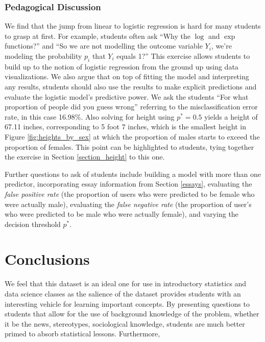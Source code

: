 \documentclass{article}\usepackage[]{graphicx}\usepackage[]{color}
\begin{document}
\subsubsection{Pedagogical Discussion}
We find that the jump from linear to logistic regression is hard for many students to grasp at first.  For example, students often ask ``Why the $\log$ and $\exp$ functions?'' and ``So we are not modelling the outcome variable $Y_i$, we're modeling the probability $p_i$ that $Y_i$ equals 1?''  This exercise allows students to build up to the notion of logistic regression from the ground up using data visualizations.  We also argue that on top of fitting the model and interpreting any results, students should also use the results to make explicit predictions and evaluate the logistic model's predictive power.  We ask the students ``For what proportion of people did you guess wrong'' referring to the misclassification error rate, in this case 16.98\%.  Also solving for height using $p^*=0.5$ yields a height of 67.11 inches, corresponding to 5 foot 7 inches, which is the smallest height in Figure \ref{fig:heights_by_sex} at which the proportion of males starts to exceed the proportion of females.  This point can be highlighted to students, tying together the exercise in Section \ref{section_height} to this one.

Further questions to ask of students include building a model with more than one predictor, incorporating essay information from Section \ref{essays}, evaluating the \textit{false positive rate} (the proportion of users who were predicted to be female who were actually male), evaluating the \textit{false negative rate} (the proportion of user's who were predicted to be male who were actually female), and varying the decision threshold $p^*$.












%
\section{Conclusions}
%
We feel that this dataset is an ideal one for use in introductory statistics and data science classes as the salience of the dataset provides students with an interesting vehicle for learning important concepts.  By presenting questions to students that allow for the use of background knowledge of the problem, whether it be the news, stereotypes, sociological knowledge, students are much better primed to absorb statistical lessons.  Furthermore,
\end{document}
